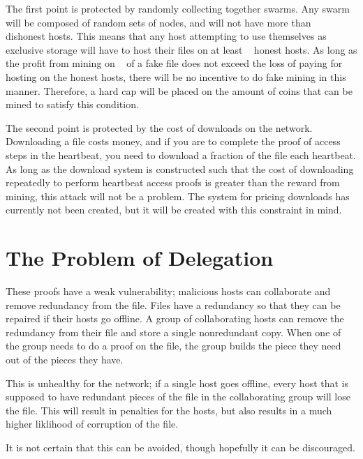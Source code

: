 \documentclass[twocolumn]{article}
\begin{document}
The first point is protected by randomly collecting together swarms.
Any swarm will be composed of random sets of nodes, and will not have more than \maxcorruption ~ dishonest hosts.
This means that any host attempting to use themselves as exclusive storage will have to host their files on at least \inversemaxcorruption ~ honest hosts.
As long as the profit from mining on \maxcorruption ~ of a fake file does not exceed the loss of paying for hosting on the \inversemaxcorruption honest hosts, there will be no incentive to do fake mining in this manner.
Therefore, a hard cap will be placed on the amount of coins that can be mined to satisfy this condition.

The second point is protected by the cost of downloads on the network.
Downloading a file costs money, and if you are to complete the proof of access steps in the heartbeat, you need to download a fraction of the file each heartbeat.
As long as the download system is constructed such that the cost of downloading repeatedly to perform heartbeat access proofs is greater than the reward from mining, this attack will not be a problem.
The system for pricing downloads has currently not been created, but it will be created with this constraint in mind.


\section{The Problem of Delegation}

These proofs have a weak vulnerability; malicious hosts can collaborate and remove redundancy from the file.
Files have a redundancy so that they can be repaired if their hosts go offline.
A group of collaborating hosts can remove the redundancy from their file and store a single nonredundant copy.
When one of the group needs to do a proof on the file, the group builds the piece they need out of the pieces they have.

This is unhealthy for the network; if a single host goes offline, every host that is supposed to have redundant pieces of the file in the collaborating group will lose the file.
This will result in penalties for the hosts, but also results in a much higher liklihood of corruption of the file.

It is not certain that this can be avoided, though hopefully it can be discouraged.
\end{document}

